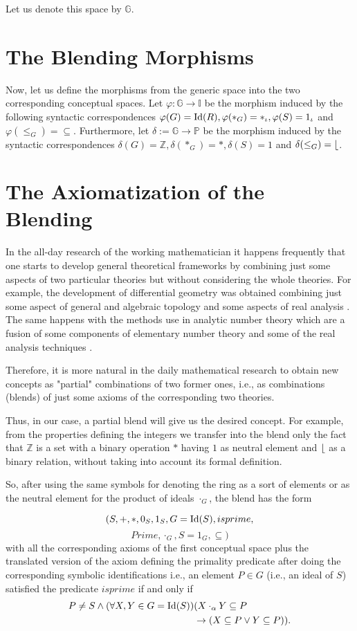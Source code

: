   Let us denote this space by $\mathbb{G}$.

\section{The Blending Morphisms}
Now, let us define the morphisms from the generic space into the two
corresponding conceptual spaces. Let $\varphi: \mathbb{G}\rightarrow
\mathbb{I}$ be the morphism induced by the following syntactic
correspondences $\varphi(G)={\rm Id}(R),\varphi(*_G)=*_{\iota},
\varphi(S)=1_{\iota}$ and $\varphi(\leq_G)=\subseteq$.
\newline\indent Furthermore, let
$\delta:=\mathbb{G}\rightarrow\mathbb{P}$ be the morphism induced by
the syntactic correspondences $\delta(G)=\mathbb{Z}, \delta(*_G)=*,
\delta(S)=1$ and $\delta(\leq_G)= \lfloor$.  

\section{The Axiomatization of the Blending}
In the all-day research of the working mathematician it happens
frequently that one starts to develop general theoretical frameworks
by combining just some aspects of two particular theories but without
considering the whole theories. For example, the development of
differential geometry was obtained combining just some aspect of
general and algebraic topology and some aspects of real analysis
\cite{VelCad05}. The same happens with the methods use in
analytic number theory which are a fusion of some components of
elementary number theory and some of the real analysis techniques
\cite{Apostol76}.

Therefore, it is more natural in the daily mathematical research to
obtain new concepts as "partial" combinations of two former ones,
i.e., as combinations (blends) of just some axioms of the
corresponding two theories.
 
Thus, in our case, a partial blend will give us the desired
concept. For example, from the properties defining the integers we
transfer into the blend only the fact that $\mathbb{Z}$ is a set with
a binary operation $*$ having $1$ as neutral element and
$\lfloor$ as a binary relation, without taking into account its
  formal definition.

So, after using the same symbols for denoting the ring as a sort of
elements or as the neutral element for the product of ideals
$\cdot_G$, the blend has the form

\[(S, +, *, 0_S, 1_S, G={\rm Id}(S), isprime,\]
\[ Prime, \cdot_G, S=1_G, \subseteq)\] with all the corresponding
axioms of the first conceptual space plus the translated version of
the axiom defining the primality predicate after doing the
corresponding symbolic identifications i.e., an element $P \in G$
(i.e., an ideal of $S$) satisfied the predicate $isprime$ if and only
if
\begin{align*}
P\neq S \wedge (\forall X,Y\in G={\rm Id}(S)) & (X\cdot_{\alpha}Y\subseteq P\\
                             & \rightarrow (X\subseteq P \vee Y\subseteq P)).
\end{align*}

